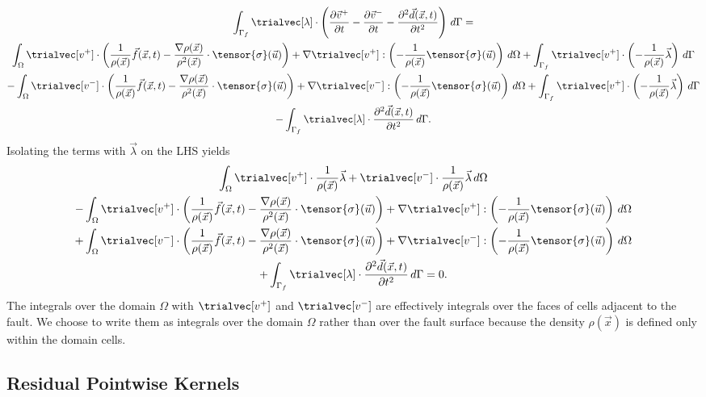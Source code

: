 \begin{multline}
  \int_{\Gamma_f} \trialvec[\lambda] \cdot \left(
    \frac{\partial \vec{v}^+}{\partial t} - \frac{\partial \vec{v}^-}{\partial t} -
    \frac{\partial^2 \vec{d}(\vec{x},t)}{\partial t^2} \right) \, d\Gamma = \\
  \int_\Omega \trialvec[v^+] \cdot \left( \frac{1}{\rho(\vec{x})} \vec{f}(\vec{x}, t)
    -\frac{\nabla \rho(\vec{x})}{\rho^2(\vec{x})} \cdot \tensor{\sigma}(\vec{u}) \right) 
  + \nabla \trialvec[v^+] : \left(-\frac{1}{\rho(\vec{x})} \tensor{\sigma}(\vec{u}) \right) \, d\Omega
  + \int_{\Gamma_f} \trialvec[v^+] \cdot \left(-\frac{1}{\rho(\vec{x})} \vec{\lambda} \right) \, d\Gamma \\
  - \int_\Omega \trialvec[v^-] \cdot \left( \frac{1}{\rho(\vec{x})} \vec{f}(\vec{x}, t)
  -\frac{\nabla \rho(\vec{x})}{\rho^2(\vec{x})} \cdot \tensor{\sigma}(\vec{u}) \right)
  + \nabla \trialvec[v^-] : \left(-\frac{1}{\rho(\vec{x})} \tensor{\sigma}(\vec{u}) \right) \, d\Omega
  + \int_{\Gamma_f} \trialvec[v^+] \cdot \left(-\frac{1}{\rho(\vec{x})} \vec{\lambda} \right) \, d\Gamma \\
  - \int_{\Gamma_f} \trialvec[\lambda] \cdot \frac{\partial^2 \vec{d}(\vec{x}, t)}{\partial t^2} \, d\Gamma.
\end{multline}
Isolating the terms with $\vec{\lambda}$ on the LHS yields
\begin{multline}
  \int_\Omega \trialvec[v^+] \cdot \frac{1}{\rho(\vec{x})} \vec{\lambda}
  + \trialvec[v^-] \cdot \frac{1}{\rho(\vec{x})} \vec{\lambda} \, d\Omega \\
  - \int_\Omega \trialvec[v^+] \cdot \left( \frac{1}{\rho(\vec{x})} \vec{f}(\vec{x}, t)
  -\frac{\nabla \rho(\vec{x})}{\rho^2(\vec{x})} \cdot \tensor{\sigma}(\vec{u}) \right)
  + \nabla \trialvec[v^+] : \left(-\frac{1}{\rho(\vec{x})} \tensor{\sigma}(\vec{u}) \right) \, d\Omega \\
  + \int_\Omega \trialvec[v^-] \cdot \left( \frac{1}{\rho(\vec{x})} \vec{f}(\vec{x}, t)
  -\frac{\nabla \rho(\vec{x})}{\rho^2(\vec{x})} \cdot \tensor{\sigma}(\vec{u}) \right)
  + \nabla \trialvec[v^-] : \left(-\frac{1}{\rho(\vec{x})} \tensor{\sigma}(\vec{u}) \right) \, d\Omega \\
  + \int_{\Gamma_f} \trialvec[\lambda] \cdot \frac{\partial^2 \vec{d}(\vec{x}, t)}{\partial t^2} \, d\Gamma
  = 0.
\end{multline}
The integrals over the domain $\Omega$ with $\trialvec[v^+]$ and
$\trialvec[v^-]$ are effectively integrals over the faces of cells
adjacent to the fault. We choose to write them as integrals over the
domain $\Omega$ rather than over the fault surface because the density
$\rho(\vec{x})$ is defined only within the domain cells.

\subsection{Residual Pointwise Kernels}




